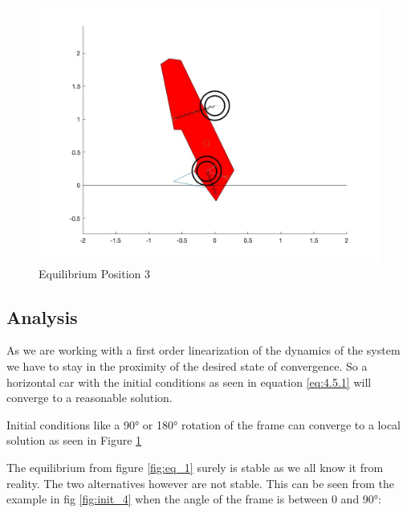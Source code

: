 \begin{figure}[ht]
    \centering
    \includegraphics[scale=0.235]{images/Equilibrium3.jpg}
    \caption{Equilibrium Position 3}
    \label{fig:eq_3}
\end{figure}

\subsection{Analysis}
As we are working with a first order linearization of the dynamics of the system we have to stay in the proximity of the desired state of convergence. So a horizontal car with the initial conditions as seen in equation \ref{eq:4.5.1} will converge to a reasonable solution. \\\vspace{3mm}

\noindent Initial conditions like a 90° or 180° rotation of the frame can converge to a local solution as seen in Figure \ref*{fig:eq_3}\\\vspace{3mm}

\noindent The equilibrium from figure \ref{fig:eq_1} surely is stable as we all know it from reality. The two alternatives however are not stable. This can be seen from the example in fig \ref{fig:init_4} when the angle of the frame is between 0 and 90°:

